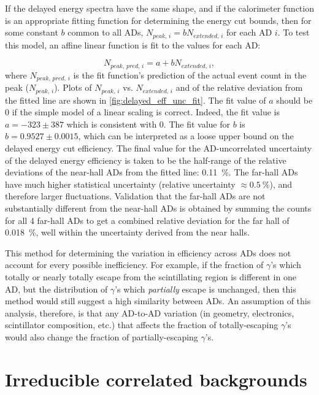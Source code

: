 If the delayed energy spectra have the same shape,
and if the calorimeter function is an appropriate fitting function
for determining the energy cut bounds,
then for some constant $b$ common to all ADs,
$N_{peak,\,i} = b N_{extended,\,i}$ for each AD $i$.
To test this model, an affine linear function is fit
to the values for each AD:

\begin{equation}
    N_{peak,\,pred,\,i} = a + b N_{extended,\,i},
\end{equation}
where $N_{peak,\,pred,\,i}$ is the fit function's prediction
of the actual event count in the peak ($N_{peak,\,i}$).
Plots of $N_{peak,\,i}$ vs. $N_{extended,\,i}$ and of the
relative deviation from the fitted line are shown in \cref{fig:delayed_eff_unc_fit}.
The fit value of $a$ should be $0$ if the simple model of
a linear scaling is correct.
Indeed, the fit value is $a = -323 \pm 387$
which is consistent with $0$.
The fit value for $b$ is $b = 0.9527 \pm 0.0015$,
which can be interpreted as a loose upper bound
on the delayed energy cut efficiency.
The final value for the AD-uncorrelated uncertainty
of the delayed energy efficiency is taken to be
the half-range of the relative deviations
of the near-hall ADs from the fitted line: \SI{0.11}{\percent}.
The far-hall ADs have much higher statistical uncertainty
(relative uncertainty $\approx\SI{0.5}{\percent}$),
and therefore larger fluctuations.
Validation that the far-hall ADs are not
substantially different from the near-hall ADs is obtained by
summing the counts for all 4 far-hall ADs to get
a combined relative deviation for the far hall of \SI{0.018}{\percent},
well within the uncertainty derived from the near halls.

This method for determining the variation in efficiency across ADs
does not account for every possible inefficiency.
For example, if the fraction of $\gamma$'s which totally or nearly totally
escape from the scintillating region is different in one AD,
but the distribution of $\gamma$'s which \textit{partially} escape is unchanged,
then this method would still suggest a high similarity between ADs.
An assumption of this analysis, therefore, is that any AD-to-AD variation
(in geometry, electronics, scintillator composition, etc.)
that affects the fraction of totally-escaping $\gamma$'s
would also change the fraction of partially-escaping $\gamma$'s.

\section{Irreducible correlated backgrounds}
\label{sec:correlated_bg}

